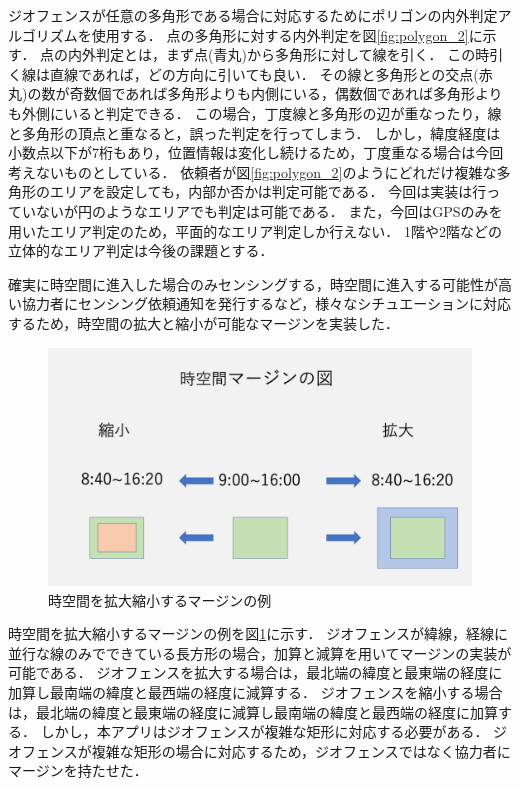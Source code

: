 ジオフェンスが任意の多角形である場合に対応するためにポリゴンの内外判定アルゴリズム\cite{naigai}を使用する．
点の多角形に対する内外判定を図\ref{fig:polygon_2}に示す．
点の内外判定とは，まず点(青丸)から多角形に対して線を引く．
この時引く線は直線であれば，どの方向に引いても良い．
その線と多角形との交点(赤丸)の数が奇数個であれば多角形よりも内側にいる，偶数個であれば多角形よりも外側にいると判定できる．
この場合，丁度線と多角形の辺が重なったり，線と多角形の頂点と重なると，誤った判定を行ってしまう．
しかし，緯度経度は小数点以下が7桁もあり，位置情報は変化し続けるため，丁度重なる場合は今回考えないものとしている．
依頼者が図\ref{fig:polygon_2}のようにどれだけ複雑な多角形のエリアを設定しても，内部か否かは判定可能である．
今回は実装は行っていないが円のようなエリアでも判定は可能である．
また，今回はGPSのみを用いたエリア判定のため，平面的なエリア判定しか行えない．
1階や2階などの立体的なエリア判定は今後の課題とする．

確実に時空間に進入した場合のみセンシングする，時空間に進入する可能性が高い協力者にセンシング依頼通知を発行するなど，様々なシチュエーションに対応するため，時空間の拡大と縮小が可能なマージンを実装した．

\begin{figure}[tbh]
    \centering
    \includegraphics[width=16cm]{img_margin_1.png}
    \caption{時空間を拡大縮小するマージンの例}
    \label{fig:margin_1}
\end{figure}

時空間を拡大縮小するマージンの例を図\ref{fig:margin_1}に示す．
ジオフェンスが緯線，経線に並行な線のみでできている長方形の場合，加算と減算を用いてマージンの実装が可能である．
ジオフェンスを拡大する場合は，最北端の緯度と最東端の経度に加算し最南端の緯度と最西端の経度に減算する．
ジオフェンスを縮小する場合は，最北端の緯度と最東端の経度に減算し最南端の緯度と最西端の経度に加算する．
しかし，本アプリはジオフェンスが複雑な矩形に対応する必要がある．
ジオフェンスが複雑な矩形の場合に対応するため，ジオフェンスではなく協力者にマージンを持たせた．

